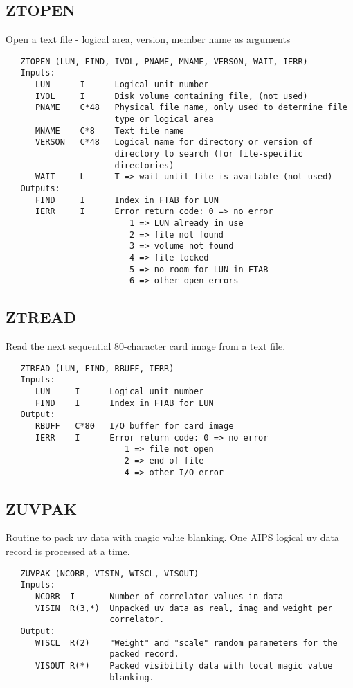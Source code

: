 \subsection{ZTOPEN}
Open a text file - logical area, version, member name as arguments
\begin{verbatim}
   ZTOPEN (LUN, FIND, IVOL, PNAME, MNAME, VERSON, WAIT, IERR)
   Inputs:
      LUN      I      Logical unit number
      IVOL     I      Disk volume containing file, (not used)
      PNAME    C*48   Physical file name, only used to determine file
                      type or logical area
      MNAME    C*8    Text file name
      VERSON   C*48   Logical name for directory or version of
                      directory to search (for file-specific
                      directories)
      WAIT     L      T => wait until file is available (not used)
   Outputs:
      FIND     I      Index in FTAB for LUN
      IERR     I      Error return code: 0 => no error
                         1 => LUN already in use
                         2 => file not found
                         3 => volume not found
                         4 => file locked
                         5 => no room for LUN in FTAB
                         6 => other open errors
\end{verbatim}

\subsection{ZTREAD}
Read the next sequential 80-character card image from a text file.
\begin{verbatim}
   ZTREAD (LUN, FIND, RBUFF, IERR)
   Inputs:
      LUN     I      Logical unit number
      FIND    I      Index in FTAB for LUN
   Output:
      RBUFF   C*80   I/O buffer for card image
      IERR    I      Error return code: 0 => no error
                        1 => file not open
                        2 => end of file
                        4 => other I/O error
\end{verbatim}

\subsection{ZUVPAK}
Routine to pack uv data with magic value blanking.  One AIPS
logical uv data record is processed at a time.
\begin{verbatim}
   ZUVPAK (NCORR, VISIN, WTSCL, VISOUT)
   Inputs:
      NCORR  I       Number of correlator values in data
      VISIN  R(3,*)  Unpacked uv data as real, imag and weight per
                     correlator.
   Output:
      WTSCL  R(2)    "Weight" and "scale" random parameters for the
                     packed record.
      VISOUT R(*)    Packed visibility data with local magic value
                     blanking.
\end{verbatim}

